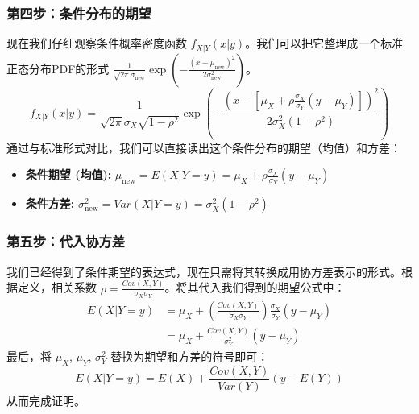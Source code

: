 \documentclass[UTF8]{ctexart}
\begin{document}
\subsubsection*{第四步：条件分布的期望}

现在我们仔细观察条件概率密度函数 $f_{X|Y}(x|y)$。我们可以把它整理成一个标准正态分布PDF的形式 $\frac{1}{\sqrt{2\pi}\sigma_{\text{new}}}\exp(-\frac{(x-\mu_{\text{new}})^2}{2\sigma_{\text{new}}^2})$。
$$
f_{X|Y}(x|y) = \frac{1}{\sqrt{2\pi}\sigma_X\sqrt{1-\rho^2}} \exp\left( -\frac{\left( x - \left[ \mu_X + \rho\frac{\sigma_X}{\sigma_Y}(y-\mu_Y) \right] \right)^2}{2\sigma_X^2(1-\rho^2)} \right)
$$
通过与标准形式对比，我们可以直接读出这个条件分布的期望（均值）和方差：
\begin{itemize}
    \item \textbf{条件期望 (均值):} $\mu_{\text{new}} = E(X|Y=y) = \mu_X + \rho\frac{\sigma_X}{\sigma_Y}(y-\mu_Y)$
    \item \textbf{条件方差:} $\sigma_{\text{new}}^2 = Var(X|Y=y) = \sigma_X^2(1-\rho^2)$
\end{itemize}

\subsubsection*{第五步：代入协方差}

我们已经得到了条件期望的表达式，现在只需将其转换成用协方差表示的形式。根据定义，相关系数 $\rho = \frac{Cov(X,Y)}{\sigma_X\sigma_Y}$。将其代入我们得到的期望公式中：
\begin{align*}
E(X|Y=y) &= \mu_X + \left( \frac{Cov(X,Y)}{\sigma_X\sigma_Y} \right) \frac{\sigma_X}{\sigma_Y} (y-\mu_Y) \\
&= \mu_X + \frac{Cov(X,Y)}{\sigma_Y^2} (y-\mu_Y)
\end{align*}
最后，将 $\mu_X$, $\mu_Y$, $\sigma_Y^2$ 替换为期望和方差的符号即可：
$$
E(X|Y=y) = E(X) + \frac{Cov(X,Y)}{Var(Y)}(y - E(Y))
$$
从而完成证明。
\end{document}
